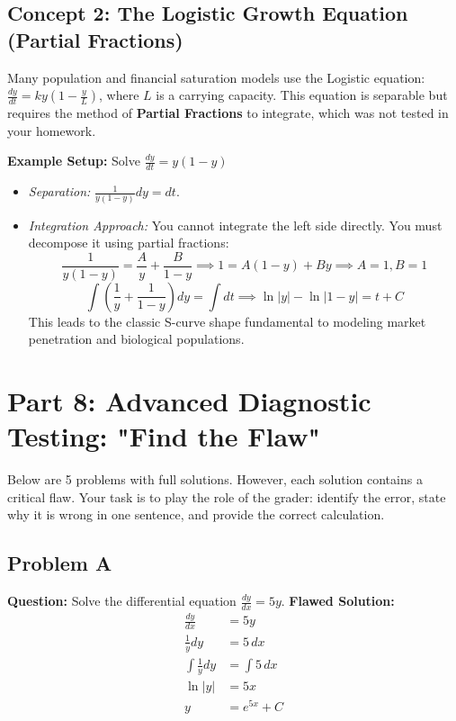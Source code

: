 \documentclass[11pt]{article}
\begin{document}
\subsection{Concept 2: The Logistic Growth Equation (Partial Fractions)}
Many population and financial saturation models use the Logistic equation: $\frac{dy}{dt} = ky(1 - \frac{y}{L})$, where $L$ is a carrying capacity. This equation is separable but requires the method of \textbf{Partial Fractions} to integrate, which was not tested in your homework.

\textbf{Example Setup:} Solve $\frac{dy}{dt} = y(1 - y)$
\begin{itemize}
    \item \textit{Separation:} $\frac{1}{y(1-y)} dy = dt$.
    \item \textit{Integration Approach:} You cannot integrate the left side directly. You must decompose it using partial fractions:
    \[ \frac{1}{y(1-y)} = \frac{A}{y} + \frac{B}{1-y} \implies 1 = A(1-y) + By \implies A=1, B=1 \]
    \[ \int \left( \frac{1}{y} + \frac{1}{1-y} \right) dy = \int dt \implies \ln|y| - \ln|1-y| = t + C \]
    This leads to the classic S-curve shape fundamental to modeling market penetration and biological populations.
\end{itemize}

\newpage
\section{Part 8: Advanced Diagnostic Testing: "Find the Flaw"}

Below are 5 problems with full solutions. However, each solution contains a critical flaw. Your task is to play the role of the grader: identify the error, state why it is wrong in one sentence, and provide the correct calculation.

\subsection*{Problem A}
\textbf{Question:} Solve the differential equation $\frac{dy}{dx} = 5y$.
\newline
\textbf{Flawed Solution:}
\begin{align*}
    \frac{dy}{dx} &= 5y \\
    \frac{1}{y} dy &= 5 \, dx \\
    \int \frac{1}{y} dy &= \int 5 \, dx \\
    \ln|y| &= 5x \\
    y &= e^{5x} + C
\end{align*}
\end{document}
